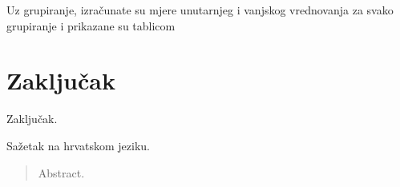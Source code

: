 \documentclass[times, utf8, zavrsni]{fer}
\begin{document}
Uz grupiranje, izračunate su mjere unutarnjeg i vanjskog vrednovanja za svako grupiranje i prikazane su tablicom %

\chapter{Zaključak}
\label{chap:conclusion}
Zaključak.




\begin{sazetak}
Sažetak na hrvatskom jeziku.

\end{sazetak}
\begin{abstract}
Abstract.

\end{abstract}
\end{document}
